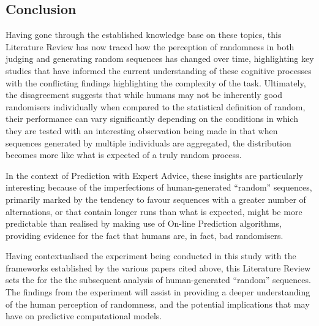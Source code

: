 
\newpage



\subsection{Conclusion}
Having gone through the established knowledge base on these topics, this Literature Review has now traced how the perception of randomness in both judging and generating random sequences has changed over time, highlighting key studies that have informed the current understanding of these cognitive processes with the conflicting findings highlighting the complexity of the task. Ultimately, the disagreement suggests that while humans may not be inherently good randomisers individually when compared to the statistical definition of random, their performance can vary significantly depending on the conditions in which they are tested with an interesting observation being made in that when sequences generated by multiple individuals are aggregated, the distribution becomes more like what is expected of a truly random process.

In the context of Prediction with Expert Advice, these insights are particularly interesting because of the imperfections of human-generated ``random'' sequences, primarily marked by the tendency to favour sequences with a greater number of alternations, or that contain longer runs than what is expected, might be more predictable than realised by making use of On-line Prediction algorithms, providing evidence for the fact that humans are, in fact, bad randomisers.

Having contextualised the experiment being conducted in this study with the frameworks established by the various papers cited above, this Literature Review sets the for the the subsequent analysis of human-generated ``random'' sequences. The findings from the experiment will assist in providing a deeper understanding of the human perception of randomness, and the potential implications that may have on predictive computational models.